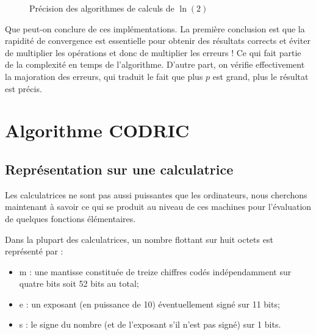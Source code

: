 \documentclass{article}
\begin{document}
\begin{figure}[htp]
  \caption{Précision des algorithmes de calculs de $\ln(2)$}
  \label{fig:2}
\end{figure}

Que peut-on conclure de ces implémentations. La première conclusion est que la rapidité de convergence est essentielle pour obtenir des résultats corrects et éviter de multiplier les opérations et donc de multiplier les erreurs ! Ce qui fait partie de la complexité en temps de l'algorithme. D'autre part, on vérifie effectivement la majoration des erreurs, qui traduit le fait que plus $p$ est grand, plus le résultat est précis.

\section{Algorithme CODRIC}
\subsection{Représentation sur une calculatrice}
Les calculatrices ne sont pas aussi puissantes que les ordinateurs, nous cherchons maintenant à savoir ce qui se produit au niveau de ces machines pour l'évaluation de quelques fonctions élémentaires.

Dans la plupart des calculatrices, un nombre flottant sur huit octets est représenté par :
\begin{itemize}
    \item m : une mantisse constituée de treize chiffres codés indépendamment sur quatre bits soit 52 bits au total;
    \item e : un exposant (en puissance de 10) éventuellement signé sur 11 bits;
    \item s : le signe du nombre (et de l'exposant s'il n'est pas signé) sur 1 bits.
\end{itemize}
\end{document}

